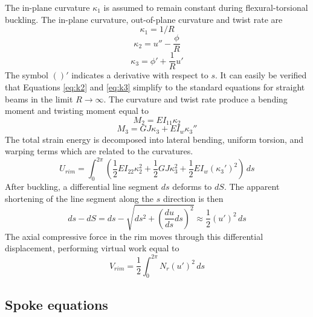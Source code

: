 \documentclass{bmd2016p}
\begin{document}
The in-plane curvature $\kappa_1$ is assumed to remain constant during flexural-torsional buckling. The in-plane curvature, out-of-plane curvature and twist rate are
	\begin{equation}\label{eq:k1}
	\kappa_1 = 1/R
	\end{equation}
	\begin{equation}\label{eq:k2}
	\kappa_2 = u'' - \frac{\phi}{R}
	\end{equation}
	\begin{equation}\label{eq:k3}
	\kappa_3 = \phi' + \frac{1}{R} u'
	\end{equation}
The symbol $()'$ indicates a derivative with respect to $s$. It can easily be verified that Equations \ref{eq:k2} and \ref{eq:k3} simplify to the standard equations for straight beams in the limit $R\rightarrow \infty$. The curvature and twist rate produce a bending moment and twisting moment equal to
	\begin{equation}\label{eq:M2}
	M_2 = EI_{11} \kappa_2
	\end{equation}
	\begin{equation}\label{eq:M3}
	M_3 = GJ \kappa_3 + EI_w \kappa_3''
	\end{equation}
The total strain energy is decomposed into lateral bending, uniform torsion, and warping terms which are related to the curvatures.
	\begin{equation}\label{eq:Urim}
	U_{rim} = \int_0^{2\pi} \left( \frac{1}{2} EI_{22} \kappa_2^2 + \frac{1}{2} GJ \kappa_3^2 + \frac{1}{2} EI_w (\kappa_3')^2 \right)\, ds
	\end{equation}
After buckling, a differential line segment $ds$ deforms to $dS$. The apparent shortening of the line segment along the $s$ direction is then
	\begin{equation}\label{eq:ds}
	ds - dS = ds - \sqrt{ds^2 + \left(\frac{du}{ds}ds\right)^2} \approx \frac{1}{2} (u')^2 \, ds
	\end{equation}
The axial compressive force in the rim moves through this differential displacement, performing virtual work equal to
	\begin{equation}\label{eq:Vrim}
	V_{rim} = \frac{1}{2} \int_0^{2\pi} N_r (u')^2 \, ds
	\end{equation}


\subsection{Spoke equations}
\end{document}
